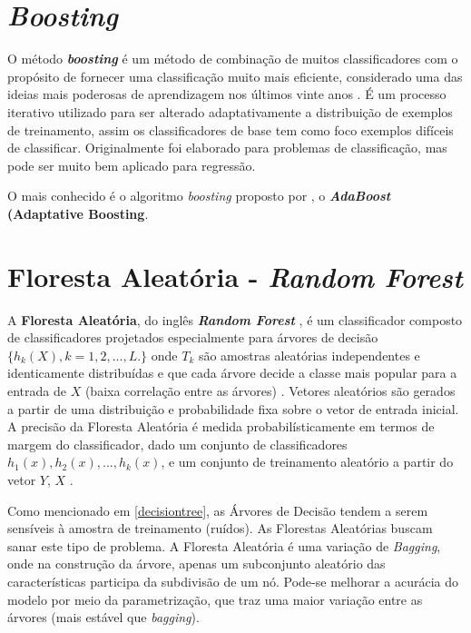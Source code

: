 \documentclass[
  openany]{book}
\begin{document}
\hypertarget{boost}{%
\section{\texorpdfstring{\emph{Boosting}}{Boosting}}\label{boost}}

O método \textbf{\emph{boosting}} \citep{freund1996experiments} é um método de combinação de muitos classificadores com o propósito de fornecer uma classificação muito mais eficiente, considerado uma das ideias mais poderosas de aprendizagem nos últimos vinte anos \citep{hastie2009elements}. É um processo iterativo utilizado para ser alterado adaptativamente a distribuição de exemplos de treinamento, assim os classificadores de base tem como foco exemplos difíceis de classificar. Originalmente foi elaborado para problemas de classificação, mas pode ser muito bem aplicado para regressão.

O mais conhecido é o algoritmo \emph{boosting} proposto por \citet{freund1996experiments}, o \textbf{\emph{AdaBoost} (Adaptative Boosting}.

\hypertarget{rf}{%
\section{\texorpdfstring{Floresta Aleatória - \emph{Random Forest}}{Floresta Aleatória - Random Forest}}\label{rf}}

A \textbf{Floresta Aleatória}, do inglês \textbf{\emph{Random Forest}} \citep{breiman2001random, liaw2002classification}, é um classificador composto de classificadores projetados especialmente para árvores de decisão \(\{h_k(X),k=1,2,...,L.\}\) onde \(T_k\) são amostras aleatórias independentes e identicamente distribuídas e que cada árvore decide a classe mais popular para a entrada de \(X\) (baixa correlação entre as árvores) . Vetores aleatórios são gerados a partir de uma distribuição e probabilidade fixa sobre o vetor de entrada inicial. A precisão da Floresta Aleatória é medida probabilísticamente em termos de margem do classificador, dado um conjunto de classificadores \(h_1(x), h_2(x),...,h_k(x)\), e um conjunto de treinamento aleatório a partir do vetor \(Y\), \(X\) \citep{gomez2012random}.

Como mencionado em \ref{decisiontree}, as Árvores de Decisão tendem a serem sensíveis à amostra de treinamento (ruídos). As Florestas Aleatórias buscam sanar este tipo de problema. A Floresta Aleatória é uma variação de \emph{Bagging}, onde na construção da árvore, apenas um subconjunto aleatório das características participa da subdivisão de um nó. Pode-se melhorar a acurácia do modelo por meio da parametrização, que traz uma maior variação entre as árvores (mais estável que \emph{bagging}).
\end{document}
